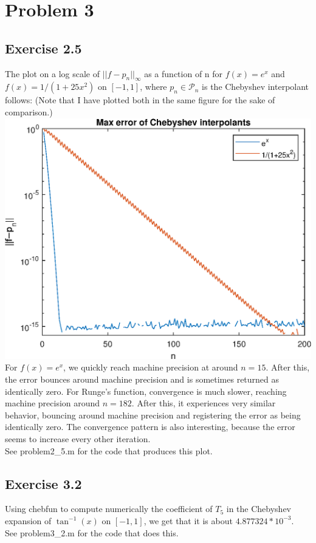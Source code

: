 \documentclass{article}
\begin{document}
\section{Problem 3}
\subsection{Exercise 2.5}
The plot on a log scale of $||f-p_n||_\infty$ as a function of n for $f(x) = e^x$ and $f(x)=1/(1+25x^2)$ on $[-1, 1]$, where $p_n\in\mathcal{P}_n$ is the Chebyshev interpolant follows: (Note that I have plotted both in the same figure for the sake of comparison.)\\
\includegraphics[]{prob2-5.eps}\\
For $f(x) = e^x$, we quickly reach machine precision at around $n=15$. After this, the error bounces around machine precision and is sometimes returned as identically zero. For Runge's function, convergence is much slower, reaching machine precision around $n=182$. After this, it experiences very similar behavior, bouncing around machine precision and registering the error as being identically zero. The convergence pattern is also interesting, because the error seems to increase every other iteration.   \\
See problem2\_5.m for the code that produces this plot.
\subsection{Exercise 3.2}
Using chebfun to compute numerically the coefficient of $T_5$ in the Chebyshev expansion of $\tan^{-1}(x)$ on $[-1,1]$, we get that it is about $4.877324*10^{-3}$.\\
See problem3\_2.m for the code that does this.
\end{document}

